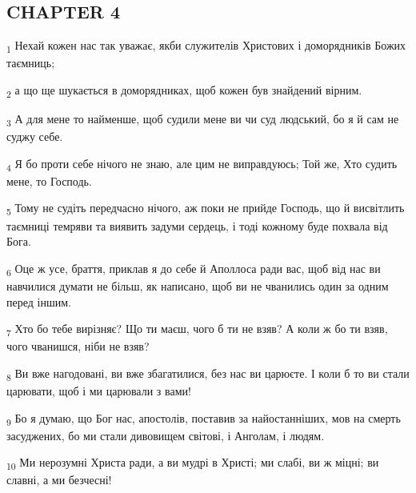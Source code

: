 \subsection{CHAPTER 4}
\begin{tcolorbox}
\textsubscript{1} Нехай кожен нас так уважає, якби служителів Христових і доморядників Божих таємниць;
\end{tcolorbox}
\begin{tcolorbox}
\textsubscript{2} а що ще шукається в доморядниках, щоб кожен був знайдений вірним.
\end{tcolorbox}
\begin{tcolorbox}
\textsubscript{3} А для мене то найменше, щоб судили мене ви чи суд людський, бо я й сам не суджу себе.
\end{tcolorbox}
\begin{tcolorbox}
\textsubscript{4} Я бо проти себе нічого не знаю, але цим не виправдуюсь; Той же, Хто судить мене, то Господь.
\end{tcolorbox}
\begin{tcolorbox}
\textsubscript{5} Тому не судіть передчасно нічого, аж поки не прийде Господь, що й висвітлить таємниці темряви та виявить задуми сердець, і тоді кожному буде похвала від Бога.
\end{tcolorbox}
\begin{tcolorbox}
\textsubscript{6} Оце ж усе, браття, приклав я до себе й Аполлоса ради вас, щоб від нас ви навчилися думати не більш, як написано, щоб ви не чванились один за одним перед іншим.
\end{tcolorbox}
\begin{tcolorbox}
\textsubscript{7} Хто бо тебе вирізняє? Що ти маєш, чого б ти не взяв? А коли ж бо ти взяв, чого чванишся, ніби не взяв?
\end{tcolorbox}
\begin{tcolorbox}
\textsubscript{8} Ви вже нагодовані, ви вже збагатилися, без нас ви царюєте. І коли б то ви стали царювати, щоб і ми царювали з вами!
\end{tcolorbox}
\begin{tcolorbox}
\textsubscript{9} Бо я думаю, що Бог нас, апостолів, поставив за найостанніших, мов на смерть засуджених, бо ми стали дивовищем світові, і Анголам, і людям.
\end{tcolorbox}
\begin{tcolorbox}
\textsubscript{10} Ми нерозумні Христа ради, а ви мудрі в Христі; ми слабі, ви ж міцні; ви славні, а ми безчесні!
\end{tcolorbox}
